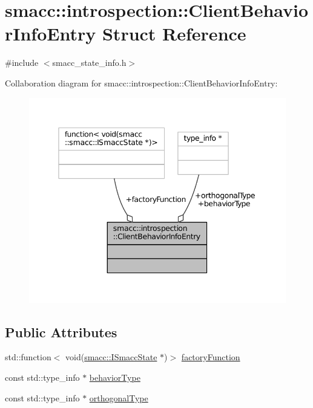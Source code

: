 \hypertarget{structsmacc_1_1introspection_1_1ClientBehaviorInfoEntry}{}\section{smacc\+:\+:introspection\+:\+:Client\+Behavior\+Info\+Entry Struct Reference}
\label{structsmacc_1_1introspection_1_1ClientBehaviorInfoEntry}


{\ttfamily \#include $<$smacc\+\_\+state\+\_\+info.\+h$>$}



Collaboration diagram for smacc\+:\+:introspection\+:\+:Client\+Behavior\+Info\+Entry\+:
\nopagebreak
\begin{figure}[H]
\begin{center}
\leavevmode
\includegraphics[width=345pt]{structsmacc_1_1introspection_1_1ClientBehaviorInfoEntry__coll__graph}
\end{center}
\end{figure}
\subsection*{Public Attributes}
\begin{DoxyCompactItemize}
\item 
std\+::function$<$ void(\hyperlink{classsmacc_1_1ISmaccState}{smacc\+::\+I\+Smacc\+State} $\ast$)$>$ \hyperlink{structsmacc_1_1introspection_1_1ClientBehaviorInfoEntry_abb0863623802e0107c659e61931518f4}{factory\+Function}
\item 
const std\+::type\+\_\+info $\ast$ \hyperlink{structsmacc_1_1introspection_1_1ClientBehaviorInfoEntry_a11156213a771b7801ae69698de326e44}{behavior\+Type}
\item 
const std\+::type\+\_\+info $\ast$ \hyperlink{structsmacc_1_1introspection_1_1ClientBehaviorInfoEntry_aabffb57e6ee723ce1b2bdb6ad30c6993}{orthogonal\+Type}
\end{DoxyCompactItemize}


